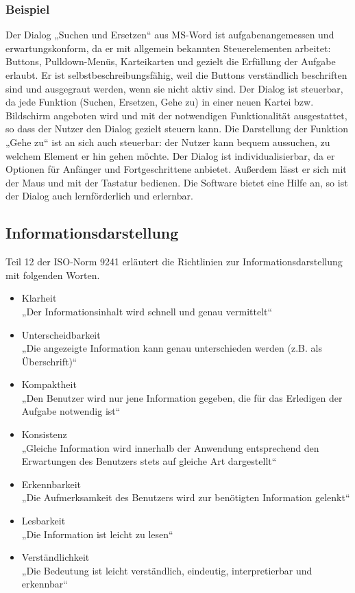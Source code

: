 \subsubsection*{Beispiel}
Der Dialog „Suchen und Ersetzen“ aus MS-Word ist aufgabenangemessen und erwartungskonform, da er mit allgemein bekannten Steuerelementen arbeitet: Buttons, Pulldown-Menüs, Karteikarten und gezielt die Erfüllung der Aufgabe erlaubt.  Er ist selbstbeschreibungsfähig, weil die Buttons verständlich beschriften sind und ausgegraut werden, wenn sie nicht aktiv sind. 
Der Dialog ist steuerbar, da jede Funktion (Suchen, Ersetzen, Gehe zu) in einer neuen Kartei bzw. Bildschirm angeboten wird und mit der notwendigen Funktionalität ausgestattet, so dass der Nutzer den Dialog gezielt steuern kann.
Die Darstellung der Funktion „Gehe zu“ ist an sich auch steuerbar: der Nutzer kann bequem aussuchen, zu welchem Element er hin gehen möchte.
Der Dialog ist individualisierbar, da er Optionen für Anfänger und Fortgeschrittene anbietet. Außerdem lässt er sich mit der Maus und mit der Tastatur bedienen.
Die Software bietet eine Hilfe an, so ist der Dialog auch lernförderlich und erlernbar.

\subsection{Informationsdarstellung}
Teil 12 der ISO-Norm 9241 erläutert die Richtlinien zur Informationsdarstellung mit folgenden Worten.

\begin{itemize}
\item Klarheit\\
„Der Informationsinhalt wird schnell und genau vermittelt“
\item Unterscheidbarkeit\\
„Die angezeigte Information kann genau unterschieden werden (z.B. als Überschrift)“
\item Kompaktheit\\
„Den Benutzer wird nur jene Information gegeben, die für das Erledigen der Aufgabe notwendig ist“
\item Konsistenz\\
„Gleiche Information wird innerhalb der Anwendung entsprechend den Erwartungen des Benutzers stets auf gleiche Art dargestellt“
\item Erkennbarkeit\\
„Die Aufmerksamkeit des Benutzers wird zur benötigten Information gelenkt“
\item Lesbarkeit\\
„Die Information ist leicht zu lesen“ 
\item Verständlichkeit\\
„Die Bedeutung ist leicht verständlich, eindeutig, interpretierbar und erkennbar“
\end{itemize}

